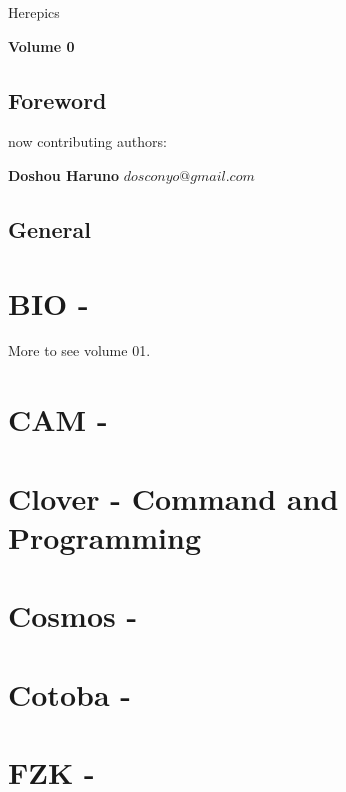 \documentclass[a4paper,12pt,UTF8]{book}
\begin{document}
\author{dosconio}
\begin{center}
	\sc\fontsize{48pt}{0}\selectfont\textcolor[rgb]{1, 0, 0.618}{Herepics}
\end{center}

\hfill\textbf{Volume 0}

\newpage %
\renewcommand{\contentsname}{Contents}
\tableofcontents

\section{Foreword} %

now contributing authors:

\textbf{Doshou Haruno}
$dosconyo@gmail.com$

\section{General}




\chapter{BIO \mbox{-} }
%

More to see volume 01.

\chapter{CAM \mbox{-} }


\chapter{Clover \mbox{-} Command and Programming}


\chapter{Cosmos \mbox{-} }


\chapter{Cotoba \mbox{-} }


\chapter{FZK \mbox{-} }

\end{document}

